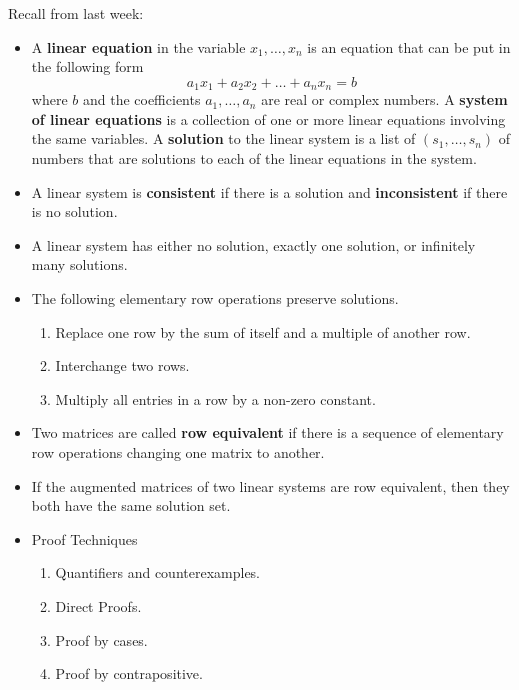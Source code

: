 \documentclass[12pt,letterpaper]{article}
\begin{document}
\thispagestyle{fancy}

Recall from last week:

\begin{itemize}

\item A {\bf linear equation} in the variable $x_1, \dots, x_n$ is an equation that can be put in the following form
\begin{equation*}
a_1 x_1 +a_2 x_2 +\dots + a_n x_n =b
\end{equation*}
where $b$ and the coefficients $a_1,\dots, a_n$ are real or complex numbers. A {\bf system of linear equations} is a collection of one or more linear equations involving the same variables. A {\bf solution} to the linear system is a list of $(s_1, \dots, s_n)$ of numbers that are solutions to each of the linear equations in the system. 

\item A linear system is {\bf consistent} if there is a solution and {\bf inconsistent} if there is no solution.

\item A linear system has either no solution, exactly one solution, or infinitely many solutions.

\item The following elementary row operations preserve solutions.
\begin{enumerate}
\item Replace one row by the sum of itself and a multiple of another row.
\item Interchange two rows.
\item Multiply all entries in a row by a non-zero constant.
\end{enumerate}

\item Two matrices are called {\bf row equivalent} if there is a sequence of elementary row operations changing one matrix to another.

\item If the augmented matrices of two linear systems are row equivalent, then they both have the same solution set. 

\item Proof Techniques
\begin{enumerate}
\item Quantifiers and counterexamples.
\item Direct Proofs.
\item Proof by cases.
\item Proof by contrapositive.
\end{enumerate}


\end{itemize}
\end{document}
